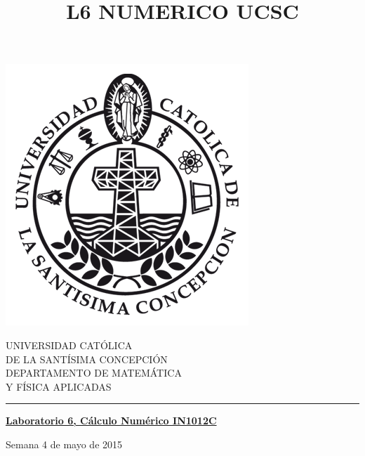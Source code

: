 \documentclass[11pt]{article}
\begin{document}
\title{L6 NUMERICO UCSC}

\begin{minipage}{0.15\textwidth}
\includegraphics[width=\textwidth]{ucsc.png}
\end{minipage}
\begin{minipage}{0.9\textwidth}
{UNIVERSIDAD CAT\'OLICA}\\ 
{DE LA SANT\'ISIMA CONCEPCI\'ON}\\
{DEPARTAMENTO DE MATEM\'ATICA}\\ 
{ Y F\'ISICA APLICADAS}\\
\rule{0.66\textwidth}{.5pt} %
\end{minipage}

\vspace*{0.5cm} \centerline {\bf\underline{Laboratorio 6, C\'alculo Num\'erico  IN1012C }}
\centerline{\textrm{Semana 4 de mayo de 2015}}  \vspace{0.2cm}




\end{document}
